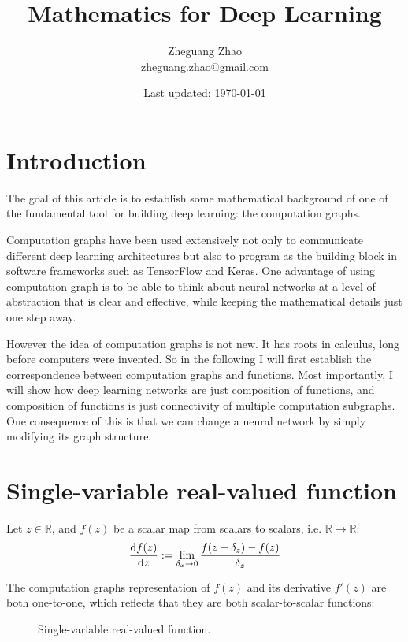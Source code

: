 \documentclass[11pt]{article}
\newcommand{\numset}[1]{\mathbb{#1}}
\newcommand{\goto}{\rightarrow}
\begin{document}
\title{Mathematics for Deep Learning}
\author{Zheguang Zhao \\  \href{mailto:zheguang.zhao@gmail.com}{zheguang.zhao@gmail.com}}
\date{Last updated: \today}
\maketitle

\section{Introduction}

The goal of this article is to establish some mathematical background of one of the fundamental tool for building deep learning: the computation graphs.  

Computation graphs have been used extensively not only to communicate different deep learning architectures but also to program as the building block in software frameworks such as TensorFlow and Keras.  One advantage of using computation graph is to be able to think about neural networks at a level of abstraction that is clear and effective, while keeping the mathematical details just one step away. 

However the idea of computation graphs is not new.  It has roots in calculus, long before computers were invented.  So in the following I will first establish the correspondence between computation graphs and functions.  Most importantly, I will show how deep learning networks are just composition of functions, and composition of functions is just connectivity of multiple computation subgraphs.  One consequence of this is that we can change a neural network by simply modifying its graph structure.


\section{Single-variable real-valued function}
Let $z \in \numset{R}$, and $f(z)$ be a scalar map from scalars to scalars, i.e. $\numset{R} \rightarrow \numset{R}$:
\begin{align}
	\dv{f(z)}{z} := \lim_{\delta_x \goto 0} \frac{f(z + \delta_z) - f(z)}{\delta_z}
\end{align}

The computation graphs representation of $f(z)$ and its derivative $f'(z)$ are both one-to-one, which reflects that they are both scalar-to-scalar functions:
\begin{figure}[h]
	\centering
		\centering
		\caption{$f(z)$}
	\caption{Single-variable real-valued function.}
\end{figure}
\end{document}
